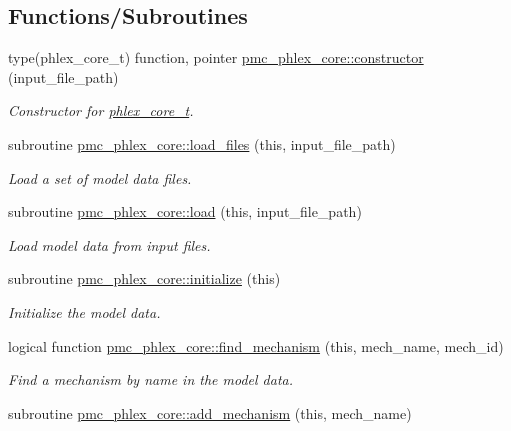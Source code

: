 \subsection*{Functions/\+Subroutines}
\begin{DoxyCompactItemize}
\item 
type(phlex\+\_\+core\+\_\+t) function, pointer \mbox{\hyperlink{namespacepmc__phlex__core_a9bba3e699da52ecd3cde9d34d85321ef}{pmc\+\_\+phlex\+\_\+core\+::constructor}} (input\+\_\+file\+\_\+path)
\begin{DoxyCompactList}\small\item\em Constructor for \mbox{\hyperlink{structpmc__phlex__core_1_1phlex__core__t}{phlex\+\_\+core\+\_\+t}}. \end{DoxyCompactList}\item 
subroutine \mbox{\hyperlink{namespacepmc__phlex__core_a676921723e6f4d12eec0d0cff50fa538}{pmc\+\_\+phlex\+\_\+core\+::load\+\_\+files}} (this, input\+\_\+file\+\_\+path)
\begin{DoxyCompactList}\small\item\em Load a set of model data files. \end{DoxyCompactList}\item 
subroutine \mbox{\hyperlink{namespacepmc__phlex__core_a9194e33c7254eb3a5e55fe272f310682}{pmc\+\_\+phlex\+\_\+core\+::load}} (this, input\+\_\+file\+\_\+path)
\begin{DoxyCompactList}\small\item\em Load model data from input files. \end{DoxyCompactList}\item 
subroutine \mbox{\hyperlink{namespacepmc__phlex__core_afa7e6d2b65e64d9c60436e334bce6c0f}{pmc\+\_\+phlex\+\_\+core\+::initialize}} (this)
\begin{DoxyCompactList}\small\item\em Initialize the model data. \end{DoxyCompactList}\item 
logical function \mbox{\hyperlink{namespacepmc__phlex__core_a3791bdf03654e5cd3c7bd95a2942c885}{pmc\+\_\+phlex\+\_\+core\+::find\+\_\+mechanism}} (this, mech\+\_\+name, mech\+\_\+id)
\begin{DoxyCompactList}\small\item\em Find a mechanism by name in the model data. \end{DoxyCompactList}\item 
subroutine \mbox{\hyperlink{namespacepmc__phlex__core_aad9f8ac0f701442ce2b7ba8e403c8052}{pmc\+\_\+phlex\+\_\+core\+::add\+\_\+mechanism}} (this, mech\+\_\+name)

\end{DoxyCompactItemize}
